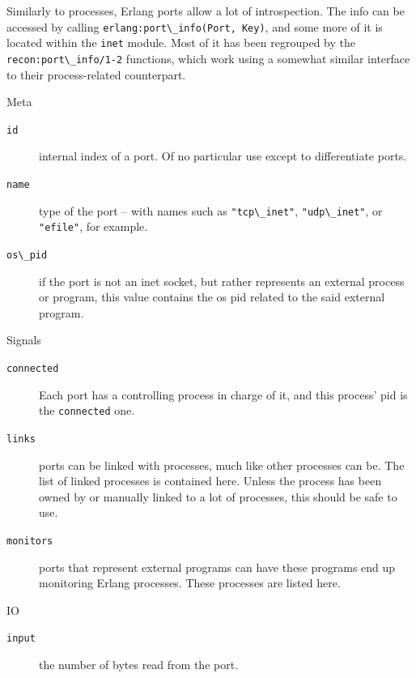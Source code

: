 \documentclass[11pt, oneside]{book}   	%
\newcommand{\module}[1]{\Verb`#1`}
\newcommand{\function}[1]{\Verb`#1`}
\newcommand{\expression}[1]{\Verb`#1`}
\begin{document}
Similarly to processes, Erlang ports allow a lot of introspection. The info can be accessed by calling \function{erlang:port\_info(Port, Key)}, and some more of it is located within the \module{inet} module. Most of it has been regrouped by the \function{recon:port\_info/1-2} functions, which work using a somewhat similar interface to their process-related counterpart. 

\begin{description*}
	\item[Meta] \hfill
		\begin{description}		
			\item[\expression{id}] internal index of a port. Of no particular use except to differentiate ports.
			
			\item[\expression{name}] type of the port -- with names such as \expression{"tcp\_inet"}, \expression{"udp\_inet"}, or \expression{"efile"}, for example.
			
			\item[\expression{os\_pid}] if the port is not an inet socket, but rather represents an external process or program, this value contains the os pid related to the said external program.
		\end{description}

	\item[Signals] \hfill
		\begin{description}		
			\item[\expression{connected}] Each port has a controlling process in charge of it, and this process' pid is the \expression{connected} one.
			
			\item[\expression{links}] ports can be linked with processes, much like other processes can be. The list of linked processes is contained here. Unless the process has been owned by or manually linked to a lot of processes, this should be safe to use.
			
			\item[\expression{monitors}] ports that represent external programs can have these programs end up monitoring Erlang processes. These processes are listed here.
		\end{description}
		
	\item[IO] \hfill
		\begin{description}		
			\item[\expression{input}] the number of bytes read from the port.
			

\end{description}
\end{description*}
\end{document}
